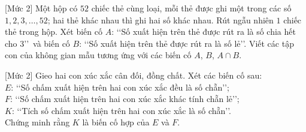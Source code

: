 \begin{bt}%
[Mức 2]
	Một hộp có $52$ chiếc thẻ cùng loại, mỗi thẻ được ghi một trong các số $1,2,3, \ldots, 52$; hai thẻ khác nhau thì ghi hai số khác nhau. Rút ngẫu nhiên $1$ chiếc thẻ trong hộp. Xét biến cố $A$: \lq\lq Số xuất hiện trên thẻ được rút ra là số chia hết cho 3\rq\rq \, và biến cố $B$: \lq\lq Số xuất hiện trên thẻ được rút ra là số lẻ\rq\rq. Viết các tập con của không gian mẫu tương ứng với các biến cố $A$, $B$, $A \cap B$.
\end{bt}

\begin{bt}%
[Mức 2]
	Gieo hai con xúc xắc cân đối, đồng chất. Xét các biến cố sau:\\
	$E$: \lq\lq Số chấm xuất hiện trên hai con xúc xắc đều là số chẵn\rq\rq;\\
	$F$: \lq\lq Số chấm xuất hiện trên hai con xúc xắc khác tính chẵn lẻ\rq\rq;\\
	$K$: \lq\lq Tích số chấm xuất hiện trên hai con xúc xắc là số chẵn\rq\rq.\\
	Chứng minh rằng $K$ là biến cố hợp của $E$ và $F$.
\end{bt}

